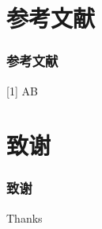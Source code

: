 ﻿\documentclass[CJK,notheorems,mathserif,table]{beamer}
\begin{document}
\begin{CJK*}{GBK}{kai}
\section{参考文献}
\begin{frame}\frametitle{参考文献}
[1] A\newline
[2] B
\end{frame}
\section{致谢}
\begin{frame}\frametitle{致谢}
Thanks
\end{frame}
\end{CJK*}
\end{document}
